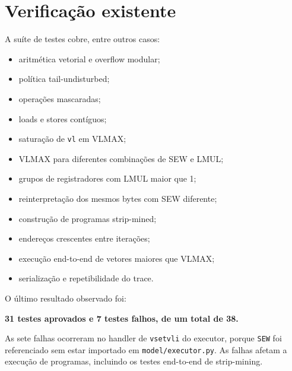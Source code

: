 
\section{Verificação existente}

A suíte de testes cobre, entre outros casos:

\begin{itemize}
    \item aritmética vetorial e overflow modular;
    \item política tail-undisturbed;
    \item operações mascaradas;
    \item loads e stores contíguos;
    \item saturação de \texttt{vl} em VLMAX;
    \item VLMAX para diferentes combinações de SEW e LMUL;
    \item grupos de registradores com LMUL maior que 1;
    \item reinterpretação dos mesmos bytes com SEW diferente;
    \item construção de programas strip-mined;
    \item endereços crescentes entre iterações;
    \item execução end-to-end de vetores maiores que VLMAX;
    \item serialização e repetibilidade do trace.
\end{itemize}

O último resultado observado foi:

\begin{center}
\textbf{31 testes aprovados e 7 testes falhos, de um total de 38.}
\end{center}

As sete falhas ocorreram no handler de \texttt{vsetvli} do executor,
porque \texttt{SEW} foi referenciado sem estar importado em
\texttt{model/executor.py}. As falhas afetam a execução de programas,
incluindo os testes end-to-end de strip-mining.